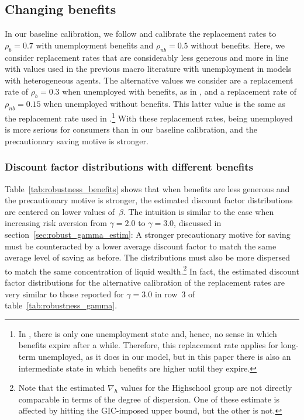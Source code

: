 \documentclass[\econtexRoot/HAFiscal]{subfiles}
\begin{document}
\hypertarget{changing-benefits}{}\subsection{Changing benefits} 
\notinsubfile{\label{sec:robust_benefits}} 

In our baseline calibration, we follow \cite{rothstein2017scraping} and calibrate the replacement rates to $\rho_b=0.7$ with unemployment benefits and $\rho_{nb}=0.5$ without benefits.
Here, we consider replacement rates that are considerably less generous and more in line with values used in the previous macro literature with unemployment in models with heterogeneous agents.
The alternative values we consider are a replacement rate of $\rho_{b}=0.3$ when unemployed with benefits, as in \cite{carroll2020modeling}, and a replacement rate of $\rho_{nb}=0.15$ when unemployed without benefits.
This latter value is the same as the replacement rate used in \cite{den2010computational}.\footnote{In \cite{den2010computational}, there is only one unemployment state and, hence, no sense in which benefits expire after a while.
Therefore, this replacement rate applies for long-term unemployed, as it does in our model, but in this paper there is also an intermediate state in which benefits are higher until they expire.} With these replacement rates, being unemployed is more serious for consumers than in our baseline calibration, and the precautionary saving motive is stronger.


\subsubsection{Discount factor distributions with different benefits}
\notinsubfile{\label{sec:robust_benefits_estim}}

Table~\ref{tab:robustness_benefits} shows that when benefits are less generous and the precautionary motive is stronger, the estimated discount factor distributions are centered on lower values of~$\beta$.
The intuition is similar to the case when increasing risk aversion from $\gamma=2.0$ to $\gamma=3.0$, discussed in section~\ref{sec:robust_gamma_estim}: A stronger precautionary motive for saving must be counteracted by a lower average discount factor to match the same average level of saving as before.
The distributions must also be more dispersed to match the same concentration of liquid wealth.\footnote{Note that the estimated $\nabla_h$ values for the Highschool group are not directly comparable in terms of the degree of dispersion.
One of these estimate is affected by hitting the GIC-imposed upper bound, but the other is not.} In fact, the estimated discount factor distributions for the alternative calibration of the replacement rates are very similar to those reported for $\gamma=3.0$ in row~3 of table~\ref{tab:robustness_gamma}.
\end{document}
